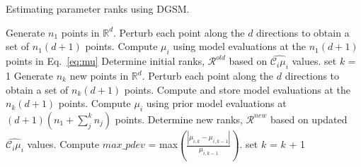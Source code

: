 \begin{breakablealgorithm}
  \caption{Estimating parameter ranks using DGSM.}
  \begin{algorithmic}[1]
      \State Generate $n_1$ points in $\mathbb{R}^{d}$.
      \State Perturb each point along the $d$ directions to obtain a set of $n_1(d+1)$ points.
      \State Compute $\mu_i$ using model evaluations at the $n_1(d+1)$ points in Eq.~\ref{eq:mu}
      \State Determine initial ranks, $\mathcal{R}^{old}$ based on $\hat{\mathcal{C}_i\mu_i}$ values.
      \State set $k$ = 1
      \Do
        \State Generate $n_k$ new points in $\mathbb{R}^{d}$.
        \State Perturb each point along the $d$ directions to obtain a set of $n_k(d+1)$ points.
        \State Compute and store model evaluations at the $n_k(d+1)$ points.
        \State Compute $\mu_i$ using prior model evaluations at $(d+1)(n_1 + \sum_j^k n_j)$ points.
        \State Determine new ranks, $\mathcal{R}^{new}$ based on updated $\hat{\mathcal{C}_i\mu_i}$ values.
        \State Compute $max\_pdev$ = max$\left(\frac{|\mu_{i,k} - 
               \mu_{i,k-1}|}{ \mu_{i,k-1}}\right)$.
        \State set $k$ = $k$ + 1
    \EndProcedure
  \end{algorithmic}
\end{breakablealgorithm}

\bigskip

%

